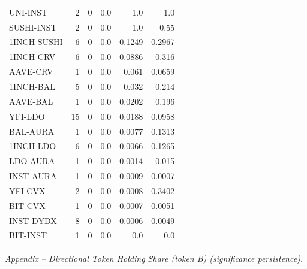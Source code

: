 \begin{table}[!ht]
{\begin{tabular}{lrrrrr}
UNI-INST & 2 & 0 & 0.0 & 1.0 & 1.0 \\
SUSHI-INST & 2 & 0 & 0.0 & 1.0 & 0.55 \\
1INCH-SUSHI & 6 & 0 & 0.0 & 0.1249 & 0.2967 \\
1INCH-CRV & 6 & 0 & 0.0 & 0.0886 & 0.316 \\
AAVE-CRV & 1 & 0 & 0.0 & 0.061 & 0.0659 \\
1INCH-BAL & 5 & 0 & 0.0 & 0.032 & 0.214 \\
AAVE-BAL & 1 & 0 & 0.0 & 0.0202 & 0.196 \\
YFI-LDO & 15 & 0 & 0.0 & 0.0188 & 0.0958 \\
BAL-AURA & 1 & 0 & 0.0 & 0.0077 & 0.1313 \\
1INCH-LDO & 6 & 0 & 0.0 & 0.0066 & 0.1265 \\
LDO-AURA & 1 & 0 & 0.0 & 0.0014 & 0.015 \\
INST-AURA & 1 & 0 & 0.0 & 0.0009 & 0.0007 \\
YFI-CVX & 2 & 0 & 0.0 & 0.0008 & 0.3402 \\
BIT-CVX & 1 & 0 & 0.0 & 0.0007 & 0.0051 \\
INST-DYDX & 8 & 0 & 0.0 & 0.0006 & 0.0049 \\
BIT-INST & 1 & 0 & 0.0 & 0.0 & 0.0 \\
\hline
\end{tabular}
}
\vspace{2mm}\textit{Appendix – Directional Token Holding Share (token B) (significance persistence).}
\end{table}